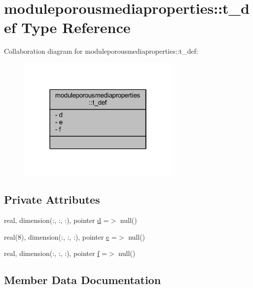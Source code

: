 \hypertarget{structmoduleporousmediaproperties_1_1t__def}{}\section{moduleporousmediaproperties\+:\+:t\+\_\+def Type Reference}
\label{structmoduleporousmediaproperties_1_1t__def}


Collaboration diagram for moduleporousmediaproperties\+:\+:t\+\_\+def\+:\nopagebreak
\begin{figure}[H]
\begin{center}
\leavevmode
\includegraphics[width=226pt]{structmoduleporousmediaproperties_1_1t__def__coll__graph}
\end{center}
\end{figure}
\subsection*{Private Attributes}
\begin{DoxyCompactItemize}
\item 
real, dimension(\+:, \+:, \+:), pointer \mbox{\hyperlink{structmoduleporousmediaproperties_1_1t__def_a5ad637836b3b98c019bb18783c08a557}{d}} =$>$ null()
\item 
real(8), dimension(\+:, \+:, \+:), pointer \mbox{\hyperlink{structmoduleporousmediaproperties_1_1t__def_a1995f63ff424862bdd520a62561aa00d}{e}} =$>$ null()
\item 
real, dimension(\+:, \+:, \+:), pointer \mbox{\hyperlink{structmoduleporousmediaproperties_1_1t__def_a2049ff219ae212a11383baea366b6c2e}{f}} =$>$ null()
\end{DoxyCompactItemize}


\subsection{Member Data Documentation}
\mbox{\label{structmoduleporousmediaproperties_1_1t__def_a5ad637836b3b98c019bb18783c08a557}} 

